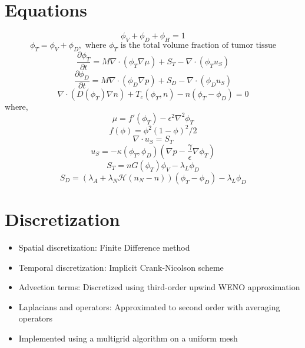 \documentclass[12pt]{article}
\begin{document}
\section*{Equations}
\begin{equation}
    \phi_V + \phi_D + \phi_H = 1
\end{equation}
\begin{equation}
    \phi_T = \phi_V + \phi_D, \text{ where } \phi_T \text{ is the total volume fraction of tumor tissue}
\end{equation}
\begin{equation}
    \frac{\partial \phi_T}{\partial t} = M \nabla \cdot \left( \phi_T \nabla \mu \right) + S_T - \nabla \cdot \left( \phi_T u_S \right)
\end{equation}
\begin{equation}
    \frac{\partial \phi_D}{\partial t} = M \nabla \cdot \left( \phi_D \nabla p \right) + S_D - \nabla \cdot \left( \phi_D u_S \right)
\end{equation}
\begin{equation}
    \nabla \cdot \left( D(\phi_T) \nabla n \right) + T_c \left( \phi_T, n \right) - n \left( \phi_T - \phi_D \right) = 0
\end{equation}
where,
\begin{equation}
    \mu = f' \left( \phi_T \right) - \epsilon^2 \nabla^2 \phi_T
\end{equation}
\begin{equation}
    f \left( \phi \right) = \phi^2 \left( 1 - \phi \right)^2 / 2
\end{equation}
\begin{equation}
    \nabla \cdot u_S = S_T
\end{equation}
\begin{equation}
    u_S = - \kappa(\phi_T, \phi_D) (\nabla p - \frac{\gamma}{\epsilon}\nabla \phi_T)
\end{equation}
\begin{equation}
    S_T = n G \left( \phi_T \right) \phi_V - \lambda_L \phi_D
\end{equation}
\begin{equation}
    S_D = (\lambda_A + \lambda_N \mathscr{H}(n_N-n))(\phi_T - \phi_D) - \lambda_L \phi_D
\end{equation}

\section*{Discretization}
\begin{itemize}
    \item Spatial discretization: Finite Difference method
    \item Temporal discretization: Implicit Crank-Nicolson scheme
    \item Advection terms: Discretized using third-order upwind WENO approximation
    \item Laplacians and operators: Approximated to second order with averaging operators
    \item Implemented using a multigrid algorithm on a uniform mesh
\end{itemize}
\end{document}
